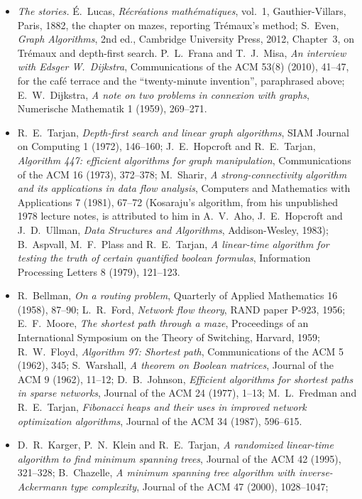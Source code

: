 \begin{itemize}
\item \emph{The stories.} \'E.~Lucas, \emph{R\'ecr\'eations math\'ematiques}, vol.~1, Gauthier-Villars, Paris, 1882, the chapter on mazes, reporting Tr\'emaux's method; S.~Even, \emph{Graph Algorithms}, 2nd ed., Cambridge University Press, 2012, Chapter~3, on
Tr\'emaux and depth-first search. P.~L.~Frana and T.~J.~Misa, \emph{An interview with Edsger W.~Dijkstra}, Communications of the ACM 53(8) (2010), 41--47, for the caf\'e terrace and the ``twenty-minute invention'', paraphrased above;
E.~W.~Dijkstra, \emph{A note on two problems in connexion with graphs}, Numerische Mathematik 1 (1959), 269--271.
\item R.~E.~Tarjan, \emph{Depth-first search and linear graph algorithms}, SIAM Journal on Computing 1 (1972), 146--160; J.~E.~Hopcroft and R.~E.~Tarjan, \emph{Algorithm 447: efficient algorithms for graph manipulation}, Communications of the ACM 16 (1973), 372--378;
M.~Sharir, \emph{A strong-connectivity algorithm and its applications in data flow analysis}, Computers and Mathematics with Applications 7 (1981), 67--72 (Kosaraju's algorithm, from his unpublished 1978 lecture notes, is attributed to him in A.~V.~Aho, J.~E.~Hopcroft and J.~D.~Ullman, \emph{Data Structures and Algorithms}, Addison-Wesley, 1983);
B.~Aspvall, M.~F.~Plass and R.~E.~Tarjan, \emph{A linear-time algorithm for testing the truth of certain quantified boolean formulas}, Information Processing Letters 8 (1979), 121--123.
\item R.~Bellman, \emph{On a routing problem}, Quarterly of Applied Mathematics 16 (1958), 87--90; L.~R.~Ford, \emph{Network flow theory}, RAND paper P-923, 1956; E.~F.~Moore, \emph{The shortest path through a maze}, Proceedings of an International Symposium on the Theory of Switching, Harvard, 1959;
R.~W.~Floyd, \emph{Algorithm 97: Shortest path}, Communications of the ACM 5 (1962), 345; S.~Warshall, \emph{A theorem on Boolean matrices}, Journal of the ACM 9 (1962), 11--12; D.~B.~Johnson, \emph{Efficient algorithms for shortest paths in sparse networks}, Journal of the ACM 24 (1977), 1--13;
M.~L.~Fredman and R.~E.~Tarjan, \emph{Fibonacci heaps and their uses in improved network optimization algorithms}, Journal of the ACM 34 (1987), 596--615.
\item D.~R.~Karger, P.~N.~Klein and R.~E.~Tarjan, \emph{A randomized linear-time algorithm to find minimum spanning trees}, Journal of the ACM 42 (1995), 321--328; B.~Chazelle, \emph{A minimum spanning tree algorithm with inverse-Ackermann type complexity}, Journal of the ACM 47 (2000), 1028--1047;

\end{itemize}
